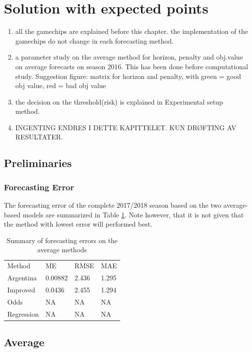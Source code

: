 \section{Solution with expected points}\label{sec:inexact}
\begin{enumerate}
    \item all the gamechips are explained before this chapter. the implementation of the gamechips do not change in each forecasting method. 
    \item a parameter study on the average method for horizon, penalty and obj.value on average forecasts on season 2016. This has been done before computational study. Suggestion figure: matrix for horizon and penalty, with green = good obj value, red = bad obj value
    \item  the decision on the threshold(risk) is explained in Experimental setup method. 
    \item INGENTING ENDRES I DETTE KAPITTELET. KUN DRØFTING AV RESULTATER. 
\end{enumerate}

\subsection{Preliminaries}
\subsubsection{Forecasting Error}
The forecasting error of the complete 2017/2018 season based on the two average-based models are summarized in Table \ref{tab:accuracy_average}. Note however, that it is not given that the method with lowest error will performed best. 

\begin{table}[H]
\centering
\caption{Summary of forecasting errors on the average methods}
\label{tab:accuracy_average}
\begin{tabular}{llll}
Method & ME & RMSE & MAE\\
Argentina & 0.00882 & 2.436 & 1.295 \\
Improved  & 0.0436  & 2.455 & 1.294 \\ 
Odds  & NA  & NA & NA   \\
Regression  & NA  & NA & NA \\
\end{tabular}
\end{table}


\subsection{Average}

